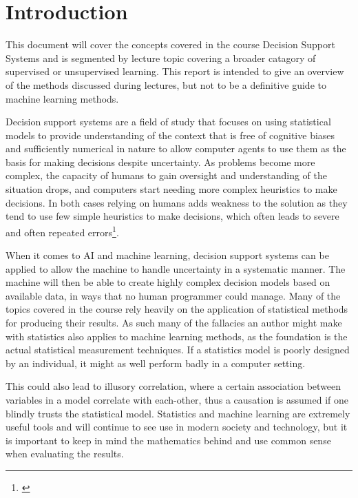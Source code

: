 \chapter{Introduction} \label{ch:introduction}

This document will cover the concepts covered in the course Decision Support Systems and is segmented by lecture topic covering a broader catagory of supervised or unsupervised learning. This report is intended to give an overview of the methods discussed during lectures, but not to be a definitive guide to machine learning methods.

Decision support systems are a field of study that focuses on using statistical models to provide understanding of the context that is free of cognitive biases and sufficiently numerical in nature to allow computer agents to use them as the basis for making decisions despite uncertainty. As problems become more complex, the capacity of humans to gain oversight and understanding of the situation drops, and computers start needing more complex heuristics to make decisions. In both cases relying on humans adds weakness to the solution as they tend to use few simple heuristics to make decisions, which often leads to severe and often repeated errors\footnote{\cite{Tversky1975}}.

When it comes to AI and machine learning, decision support systems can be applied to allow the machine to handle uncertainty in a systematic manner. The machine will then be able to create highly complex decision models based on available data, in ways that no human programmer could manage. Many of the topics covered in the course rely heavily on the application of statistical methods for producing their results. As such many of the fallacies an author might make with statistics also applies to machine learning methods, as the foundation is the actual statistical measurement techniques. If a statistics model is poorly designed by an individual, it might as well perform badly in a computer setting.

This could also lead to illusory correlation, where a certain association between variables in a model correlate with each-other, thus a causation is assumed if one blindly trusts the statistical model. Statistics and machine learning are extremely useful tools and will continue to see use in modern society and technology, but it is important to keep in mind the mathematics behind and use common sense when evaluating the results.
